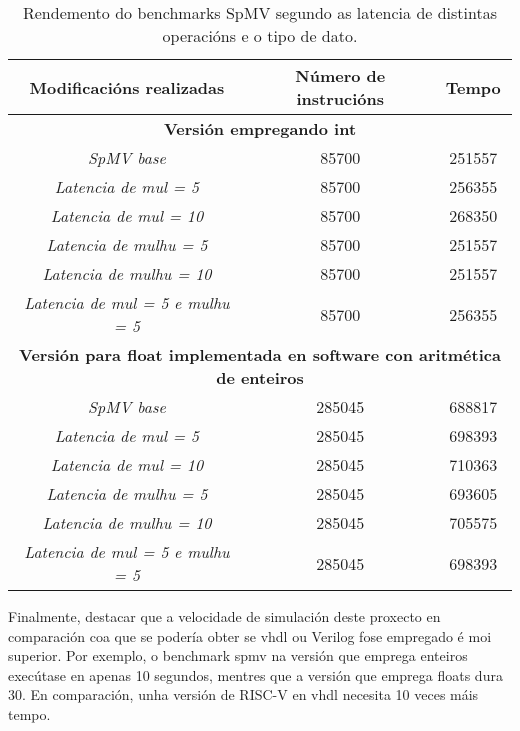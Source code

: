\begin{table}[hp!]
    \centering
    \begin{tabular}{c|c|c}
    \rowcolor{udcpink!25}
    \textbf{Modificacións realizadas} & \textbf{Número de instrucións}  & \textbf{Tempo} 
    \\\hline
    \multicolumn{3}{c}{\textbf{Versión empregando int}} \\
    \textit{SpMV base} & 85700 & 251557 \\
    \textit{Latencia de mul = 5} & 85700 & 256355\\
    \textit{Latencia de mul = 10} & 85700 & 268350\\
     \textit{Latencia de mulhu = 5} & 85700 & 251557\\ %
    \textit{Latencia de mulhu = 10} & 85700 & 251557\\ 
    \textit{Latencia de mul = 5 e mulhu = 5} & 85700 & 256355\\
    
    \multicolumn{3}{c}{\textbf{Versión para float implementada en software con aritmética de enteiros}} \\
    \textit{SpMV base} & 285045 & 688817 \\
    \textit{Latencia de mul = 5} & 285045 & 698393\\
    \textit{Latencia de mul = 10} & 285045 & 710363\\
     \textit{Latencia de mulhu = 5} & 285045 & 693605\\ 
    \textit{Latencia de mulhu = 10} & 285045 & 705575\\ 
    \textit{Latencia de mul = 5 e mulhu = 5} & 285045 & 698393\\
    \end{tabular}
    \caption{Rendemento do benchmarks SpMV segundo as latencia de distintas operacións e o tipo de dato.}
    \label{tab:rendemento_spmv}
\end{table}

Finalmente, destacar que a velocidade de simulación deste proxecto en comparación coa que se podería obter se \acrshort{vhdl} ou Verilog fose empregado é moi superior. Por exemplo, o benchmark \acrshort{spmv} na versión que emprega enteiros execútase en apenas 10 segundos, mentres que a versión que emprega floats dura 30. En comparación, unha versión de RISC-V en \acrshort{vhdl} necesita 10 veces máis tempo.